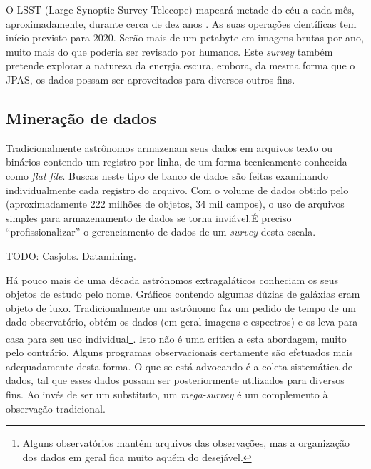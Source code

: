 O LSST (Large Synoptic Survey Telecope) mapeará metade do céu a cada mês,
aproximadamente, durante cerca de dez anos \citep{Ivezic2008}. As suas operações
científicas tem início previsto para 2020. Serão mais de um petabyte em imagens
brutas por ano, muito mais do que poderia ser revisado por humanos. Este {\em
survey} também pretende explorar a natureza da energia escura, embora, da mesma
forma que o JPAS, os dados possam ser aproveitados para diversos outros
fins.

\subsection{Mineração de dados}

Tradicionalmente astrônomos armazenam seus dados em arquivos texto ou binários
contendo um registro por linha, de um forma tecnicamente conhecida como {\em
flat file}. Buscas neste tipo de banco de dados são feitas examinando
individualmente cada registro do arquivo. Com o volume de dados obtido pelo
\galex (aproximadamente 222 milhões de objetos, 34 mil campos)\citneed, o uso de
arquivos simples para armazenamento de dados se torna inviável.\citneed É
preciso ``profissionalizar'' o gerenciamento de dados de um {\em survey} desta
escala.

TODO: Casjobs. Datamining.

Há pouco mais de uma década astrônomos extragaláticos conheciam os seus objetos
de estudo pelo nome. Gráficos contendo algumas dúzias de galáxias eram objeto de
luxo. Tradicionalmente um astrônomo faz um pedido de tempo de um dado
observatório, obtém os dados (em geral imagens e espectros) e os leva para casa
para seu uso individual\footnote{Alguns observatórios mantém arquivos das
observações\citneed, mas a organização dos dados em geral fica muito aquém do
desejável.}. Isto não é uma crítica a esta abordagem, muito pelo contrário.
Alguns programas observacionais certamente são efetuados mais adequadamente
desta forma. O que se está advocando é a coleta sistemática de dados, tal que
esses dados possam ser posteriormente utilizados para diversos fins. Ao invés de
ser um substituto, um {\em mega-survey} é um complemento à observação
tradicional.\fixme





